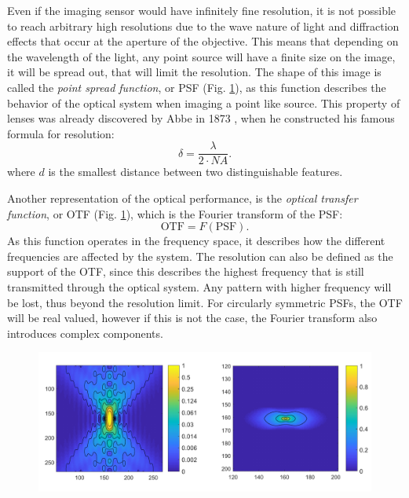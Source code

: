     Even if the imaging sensor would have infinitely fine resolution, it is not possible to reach arbitrary high resolutions due to the wave nature of light and diffraction effects that occur at the aperture of the objective. This means that depending on the wavelength of the light, any point source will have a finite size on the image, it will be spread out, that will limit the resolution. The shape of this image is called the \textit{point spread function}, or PSF (Fig. \ref{fig:psf-wf}), as this function describes the behavior of the optical system when imaging a point like source. This property of lenses was already discovered by Abbe in 1873 \cite{abbe_beitrage_1873}, when he constructed his famous formula for resolution:
    \begin{equation}
      \delta = \frac{\lambda}{2 \cdot NA}.
      \label{eq:abbe}
    \end{equation}
    where $d$ is the smallest distance between two distinguishable features.

    Another representation of the optical performance, is the \textit{optical transfer function}, or OTF (Fig. \ref{fig:psf-wf}), which is the Fourier transform of the PSF:
    \begin{equation}
      \text{OTF} = F(\text{PSF}).
    \end{equation}
    As this function operates in the frequency space, it describes how the different frequencies are affected by the system. The resolution can also be defined as the support of the OTF, since this describes the highest frequency that is still transmitted through the optical system. Any pattern with higher frequency will be lost, thus beyond the resolution limit. For circularly symmetric PSFs, the OTF will be real valued, however if this is not the case, the Fourier transform also introduces complex components.

    \begin{figure}
      \centering
      \includegraphics[width=1\textwidth]{psfs/WF.pdf}
      \label{fig:psf-wf}
    \end{figure}


